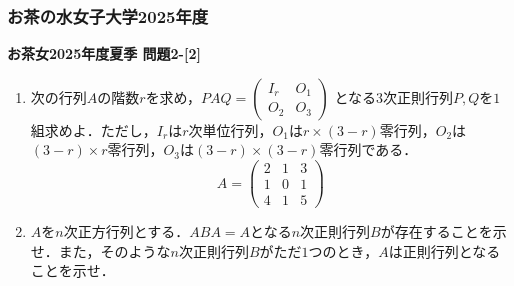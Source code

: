 \documentclass[titlepage]{jsarticle}
\numberwithin{equation}{section}
\begin{document}
\subsubsection{お茶の水女子大学2025年度}
\begin{problem}
\textbf{お茶女2025年度夏季 問題2-[2]}
\begin{enumerate}[label=(\arabic*)]
    \item 次の行列$A$の階数$r$を求め，$PAQ=
    \begin{pmatrix}
        I_r & O_1\\
        O_2 & O_3
    \end{pmatrix}$
    となる$3$次正則行列$P,Q$を$1$組求めよ．ただし，$I_r$は$r$次単位行列，$O_1$は$r\times(3-r)$零行列，$O_2$は$(3-r)\times r$零行列，$O_3$は$(3-r)\times(3-r)$零行列である．
    \[
    A=
    \begin{pmatrix}
        2 & 1 & 3\\
        1 & 0 & 1\\
        4 & 1 & 5
    \end{pmatrix}
    \]

    \item $A$を$n$次正方行列とする．$ABA=A$となる$n$次正則行列$B$が存在することを示せ．また，そのような$n$次正則行列$B$がただ$1$つのとき，$A$は正則行列となることを示せ．
\end{enumerate}
\end{problem}
\end{document}
